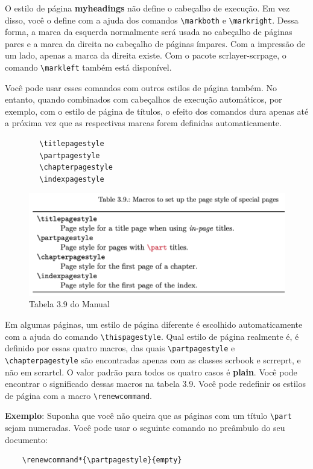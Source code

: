 O estilo de página \textbf{myheadings} não define o cabeçalho de execução. Em vez disso, você o define com a ajuda dos comandos \verb|\markboth| e \verb|\markright|. Dessa forma, a marca da esquerda normalmente será usada no cabeçalho de páginas pares e a marca da direita no cabeçalho de páginas ímpares. Com a impressão de um lado, apenas a marca da direita existe. Com o pacote scrlayer-scrpage, o comando \verb|\markleft| também está disponível.

Você pode usar esses comandos com outros estilos de página também. No entanto, quando combinados com cabeçalhos de execução automáticos, por exemplo, com o estilo de página de títulos, o efeito dos comandos dura apenas até a próxima vez que as respectivas marcas forem definidas automaticamente.
\begin{verbatim}
        \titlepagestyle
        \partpagestyle
        \chapterpagestyle
        \indexpagestyle
\end{verbatim}

\begin{figure}[ht]
    \centering
    \includegraphics[width=0.75\linewidth]{imagens/tab3_9.png}
    \caption{Tabela 3.9 do Manual}
    \label{fig:tab3_9}
\end{figure}

Em algumas páginas, um estilo de página diferente é escolhido automaticamente com a ajuda do comando \verb|\thispagestyle|. Qual estilo de página realmente é, é definido por essas quatro macros, das quais \verb|\partpagestyle| e \verb|\chapterpagestyle| são encontradas apenas com as classes scrbook e scrreprt, e não em scrartcl. O valor padrão para todos os quatro casos é \textbf{plain}. Você pode encontrar o significado dessas macros  na tabela 3.9. Você pode redefinir os estilos de página com a macro \verb|\renewcommand|.

\textbf{Exemplo}: Suponha que você não queira que as páginas com um título \verb|\part| sejam numeradas. Você pode usar o seguinte comando no preâmbulo do seu documento:
\begin{verbatim}
    \renewcommand*{\partpagestyle}{empty}
\end{verbatim}

